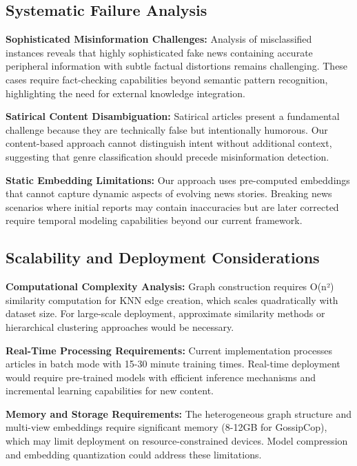 \subsection{Systematic Failure Analysis}

\textbf{Sophisticated Misinformation Challenges:} Analysis of misclassified instances reveals that highly sophisticated fake news containing accurate peripheral information with subtle factual distortions remains challenging. These cases require fact-checking capabilities beyond semantic pattern recognition, highlighting the need for external knowledge integration.

\textbf{Satirical Content Disambiguation:} Satirical articles present a fundamental challenge because they are technically false but intentionally humorous. Our content-based approach cannot distinguish intent without additional context, suggesting that genre classification should precede misinformation detection.

\textbf{Static Embedding Limitations:} Our approach uses pre-computed embeddings that cannot capture dynamic aspects of evolving news stories. Breaking news scenarios where initial reports may contain inaccuracies but are later corrected require temporal modeling capabilities beyond our current framework.

\subsection{Scalability and Deployment Considerations}

\textbf{Computational Complexity Analysis:} Graph construction requires O(n²) similarity computation for KNN edge creation, which scales quadratically with dataset size. For large-scale deployment, approximate similarity methods or hierarchical clustering approaches would be necessary.

\textbf{Real-Time Processing Requirements:} Current implementation processes articles in batch mode with 15-30 minute training times. Real-time deployment would require pre-trained models with efficient inference mechanisms and incremental learning capabilities for new content.

\textbf{Memory and Storage Requirements:} The heterogeneous graph structure and multi-view embeddings require significant memory (8-12GB for GossipCop), which may limit deployment on resource-constrained devices. Model compression and embedding quantization could address these limitations.

\EndChapter
